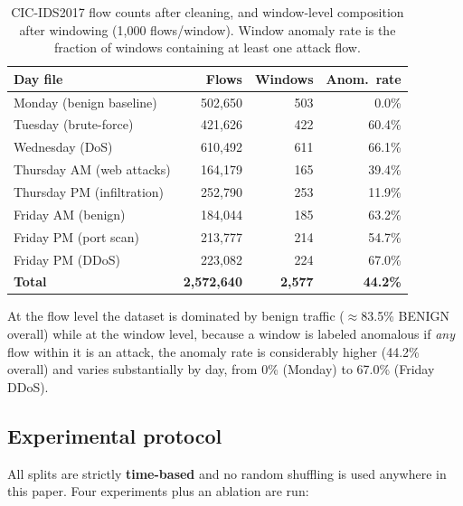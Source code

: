 \documentclass[twocolumn]{llncs}
\begin{document}
\begin{table}[t]
\centering
\caption{CIC-IDS2017 flow counts after cleaning, and window-level composition after windowing
(1{,}000 flows/window). Window anomaly rate is the fraction of windows containing at least one
attack flow.}
\label{tab:dataset}
\footnotesize
\setlength{\tabcolsep}{3pt}
\begin{tabular}{|l|r|r|r|}
\hline
Day file & Flows & Windows & Anom.\ rate \\
\hline
Monday (benign baseline)        & 502{,}650 & 503 & 0.0\% \\
Tuesday (brute-force)            & 421{,}626 & 422 & 60.4\% \\
Wednesday (DoS)                  & 610{,}492 & 611 & 66.1\% \\
Thursday AM (web attacks)        & 164{,}179 & 165 & 39.4\% \\
Thursday PM (infiltration)       & 252{,}790 & 253 & 11.9\% \\
Friday AM (benign)               & 184{,}044 & 185 & 63.2\% \\
Friday PM (port scan)            & 213{,}777 & 214 & 54.7\% \\
Friday PM (DDoS)                 & 223{,}082 & 224 & 67.0\% \\
\hline
\textbf{Total} & \textbf{2{,}572{,}640} & \textbf{2{,}577} & \textbf{44.2\%} \\
\hline
\end{tabular}
\end{table}

At the flow level the dataset is dominated by benign traffic ($\approx$83.5\% BENIGN overall) while at
the window level, because a window is labeled anomalous if \emph{any} flow within it is an attack,
the anomaly rate is considerably higher (44.2\% overall) and varies substantially by day, from 0\%
(Monday) to 67.0\% (Friday DDoS).

\subsection{Experimental protocol}
All splits are strictly \textbf{time-based} and no random shuffling is used anywhere in this paper.
Four experiments plus an ablation are run:
\end{document}

